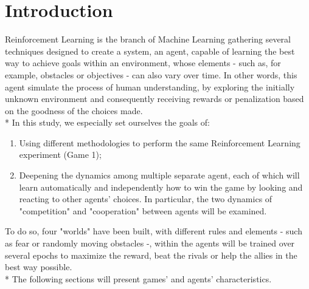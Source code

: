 \section{Introduction}
Reinforcement Learning is the branch of Machine Learning gathering several techniques designed to create a system, an agent, capable of learning the best way to achieve goals within an environment, whose elements - such as, for example, obstacles or objectives - can also vary over time. In other words, this agent simulate the process of human understanding, by exploring the initially unknown environment and consequently receiving rewards or penalization based on the goodness of the choices made.\\*
In this study, we especially set ourselves the goals of:
\begin{enumerate}
  \item Using different methodologies to perform the same Reinforcement Learning experiment (Game 1);
  \item Deepening the dynamics among multiple separate agent, each of which will learn automatically and independently how to win the game by looking and reacting to other agents' choices. In particular, the two dynamics of "competition" and "cooperation" between agents will be examined.
\end{enumerate}
To do so, four "worlds" have been built, with different rules and elements - such as fear or randomly moving obstacles -, within the agents will be trained over several epochs to maximize the reward, beat the rivals or help the allies in the best way possible.\\*
The following sections will present games' and agents' characteristics. 

